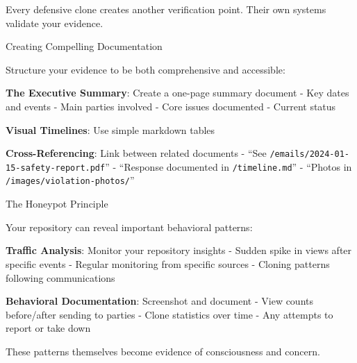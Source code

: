 Every defensive clone creates another verification point. Their own
systems validate your evidence.

Creating Compelling Documentation

Structure your evidence to be both comprehensive and accessible:

\textbf{The Executive Summary}: Create a one-page summary document - Key
dates and events - Main parties involved - Core issues documented -
Current status

\textbf{Visual Timelines}: Use simple markdown tables

\begin{Shaded}
\begin{Highlighting}[]
\PreprocessorTok{|}\PreprocessorTok{|}\PreprocessorTok{|}\PreprocessorTok{|}
\PreprocessorTok{|{-}{-}{-}{-}{-}{-}|{-}{-}{-}{-}{-}{-}{-}|{-}{-}{-}{-}{-}{-}{-}{-}{-}{-}|}
\PreprocessorTok{|}\PreprocessorTok{|}\PreprocessorTok{|}\PreprocessorTok{|}
\PreprocessorTok{|}\PreprocessorTok{|}\PreprocessorTok{|}\PreprocessorTok{|}
\PreprocessorTok{|}\PreprocessorTok{|}\PreprocessorTok{|}\PreprocessorTok{|}
\end{Highlighting}
\end{Shaded}

\textbf{Cross-Referencing}: Link between related documents - ``See
\texttt{/emails/2024-01-15-safety-report.pdf}'' - ``Response documented
in \texttt{/timeline.md}'' - ``Photos in
\texttt{/images/violation-photos/}''

The Honeypot Principle

Your repository can reveal important behavioral patterns:

\textbf{Traffic Analysis}: Monitor your repository insights - Sudden
spike in views after specific events - Regular monitoring from specific
sources - Cloning patterns following communications

\textbf{Behavioral Documentation}: Screenshot and document - View counts
before/after sending to parties - Clone statistics over time - Any
attempts to report or take down

These patterns themselves become evidence of consciousness and concern.


